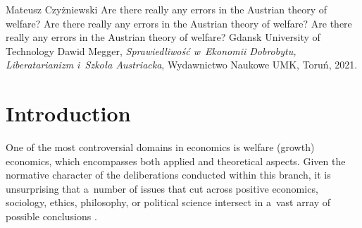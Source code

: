 \begin{newrevengenv}{Mateusz Czyżniewski}
	{Are there really any errors in the Austrian theory of welfare?}
	{Are there really any errors in the Austrian theory of welfare?}
	{Are there really any errors in the Austrian theory of welfare?}
	{Gdansk University of Technology}
	{Dawid Megger, \textit{Sprawiedliwość 
	w~Ekonomii Dobrobytu, Liberatarianizm i~Szkoła Austriacka}, Wydawnictwo Naukowe UMK, Toruń, 2021.}
	
	
























\section{Introduction}

\lettrine[loversize=0.13,lines=2,lraise=-0.03,nindent=0em,findent=0.2pt]%
{O}{}ne of the most controversial domains in economics is welfare (growth) economics, which encompasses both applied and theoretical aspects. Given the normative character of the deliberations conducted within this branch, it is unsurprising that a~number of issues that cut across positive economics, sociology, ethics, philosophy, or political science intersect in a~vast array of possible conclusions 
\parencite[][]{davis_positive-normative_1998}.%





\end{newrevengenv}
